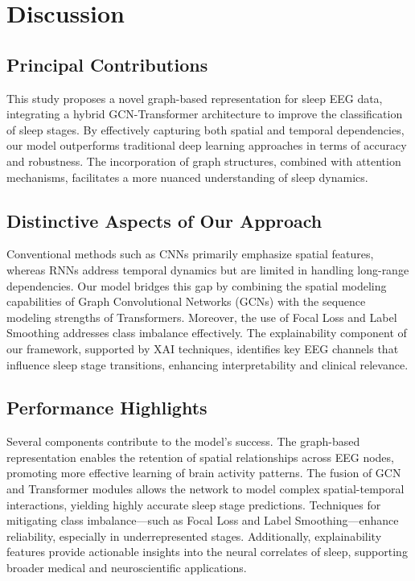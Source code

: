 \section{Discussion}

\subsection{Principal Contributions}
This study proposes a novel graph-based representation for sleep EEG data, integrating a hybrid GCN-Transformer architecture to improve the classification of sleep stages. By effectively capturing both spatial and temporal dependencies, our model outperforms traditional deep learning approaches in terms of accuracy and robustness. The incorporation of graph structures, combined with attention mechanisms, facilitates a more nuanced understanding of sleep dynamics.

\subsection{Distinctive Aspects of Our Approach}
Conventional methods such as CNNs primarily emphasize spatial features, whereas RNNs address temporal dynamics but are limited in handling long-range dependencies. Our model bridges this gap by combining the spatial modeling capabilities of Graph Convolutional Networks (GCNs) with the sequence modeling strengths of Transformers. Moreover, the use of Focal Loss and Label Smoothing addresses class imbalance effectively. The explainability component of our framework, supported by XAI techniques, identifies key EEG channels that influence sleep stage transitions, enhancing interpretability and clinical relevance.

\subsection{Performance Highlights}
Several components contribute to the model’s success. The graph-based representation enables the retention of spatial relationships across EEG nodes, promoting more effective learning of brain activity patterns. The fusion of GCN and Transformer modules allows the network to model complex spatial-temporal interactions, yielding highly accurate sleep stage predictions. Techniques for mitigating class imbalance—such as Focal Loss and Label Smoothing—enhance reliability, especially in underrepresented stages. Additionally, explainability features provide actionable insights into the neural correlates of sleep, supporting broader medical and neuroscientific applications.

